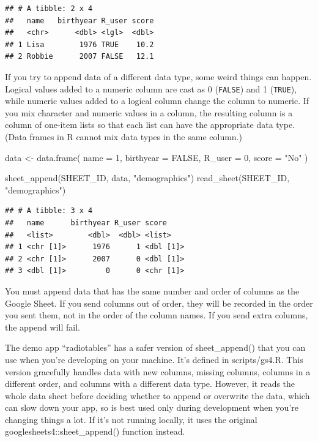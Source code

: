 \documentclass[
]{book}
\newenvironment{Shaded}{\begin{snugshade}}{\end{snugshade}}
\newcommand{\AttributeTok}[1]{\textcolor[rgb]{0.77,0.63,0.00}{#1}}
\newcommand{\ConstantTok}[1]{\textcolor[rgb]{0.00,0.00,0.00}{#1}}
\newcommand{\DecValTok}[1]{\textcolor[rgb]{0.00,0.00,0.81}{#1}}
\newcommand{\FunctionTok}[1]{\textcolor[rgb]{0.00,0.00,0.00}{#1}}
\newcommand{\NormalTok}[1]{#1}
\newcommand{\OtherTok}[1]{\textcolor[rgb]{0.56,0.35,0.01}{#1}}
\newcommand{\StringTok}[1]{\textcolor[rgb]{0.31,0.60,0.02}{#1}}
\begin{document}
\begin{verbatim}
## # A tibble: 2 x 4
##   name   birthyear R_user score
##   <chr>      <dbl> <lgl>  <dbl>
## 1 Lisa        1976 TRUE    10.2
## 2 Robbie      2007 FALSE   12.1
\end{verbatim}

If you try to append data of a different data type, some weird things can happen. Logical values added to a numeric column are cast as 0 (\texttt{FALSE}) and 1 (\texttt{TRUE}), while numeric values added to a logical column change the column to numeric. If you mix character and numeric values in a column, the resulting column is a column of one-item lists so that each list can have the appropriate data type. (Data frames in R cannot mix data types in the same column.)

\begin{Shaded}
\begin{Highlighting}[]
\NormalTok{data }\OtherTok{\textless{}{-}} \FunctionTok{data.frame}\NormalTok{(}
  \AttributeTok{name =} \DecValTok{1}\NormalTok{,}
  \AttributeTok{birthyear =} \ConstantTok{FALSE}\NormalTok{,}
  \AttributeTok{R\_user =} \DecValTok{0}\NormalTok{,}
  \AttributeTok{score =} \StringTok{"No"}
\NormalTok{)}

\FunctionTok{sheet\_append}\NormalTok{(SHEET\_ID, data, }\StringTok{"demographics"}\NormalTok{)}
\FunctionTok{read\_sheet}\NormalTok{(SHEET\_ID, }\StringTok{"demographics"}\NormalTok{)}
\end{Highlighting}
\end{Shaded}

\begin{verbatim}
## # A tibble: 3 x 4
##   name      birthyear R_user score    
##   <list>        <dbl>  <dbl> <list>   
## 1 <chr [1]>      1976      1 <dbl [1]>
## 2 <chr [1]>      2007      0 <dbl [1]>
## 3 <dbl [1]>         0      0 <chr [1]>
\end{verbatim}

You must append data that has the same number and order of columns as the Google Sheet. If you send columns out of order, they will be recorded in the order you sent them, not in the order of the column names. If you send extra columns, the append will fail.

The demo app ``radiotables'' has a safer version of sheet\_append() that you can use when you're developing on your machine. It's defined in scripts/gs4.R. This version gracefully handles data with new columns, missing columns, columns in a different order, and columns with a different data type. However, it reads the whole data sheet before deciding whether to append or overwrite the data, which can slow down your app, so is best used only during development when you're changing things a lot. If it's not running locally, it uses the original googlesheets4::sheet\_append() function instead.
\end{document}
